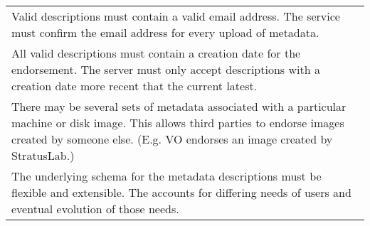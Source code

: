 \begin{table}
\begin{tabular}{p{}}
\\ Valid descriptions must contain a valid email address.  The
  service must confirm the email address for every upload of metadata.

\\ All valid descriptions must contain a creation date for the
  endorsement.  The server must only accept descriptions with a
  creation date more recent that the current latest.

\\ There may be several sets of metadata associated with a
  particular machine or disk image. This allows third parties to
  endorse images created by someone else. (E.g. VO endorses an image
  created by StratusLab.)

\\ The underlying schema for the metadata descriptions must be
  flexible and extensible.  The accounts for differing needs of users
  and eventual evolution of those needs.

\\
\hline\hline
\end{tabular}
\end{table}
